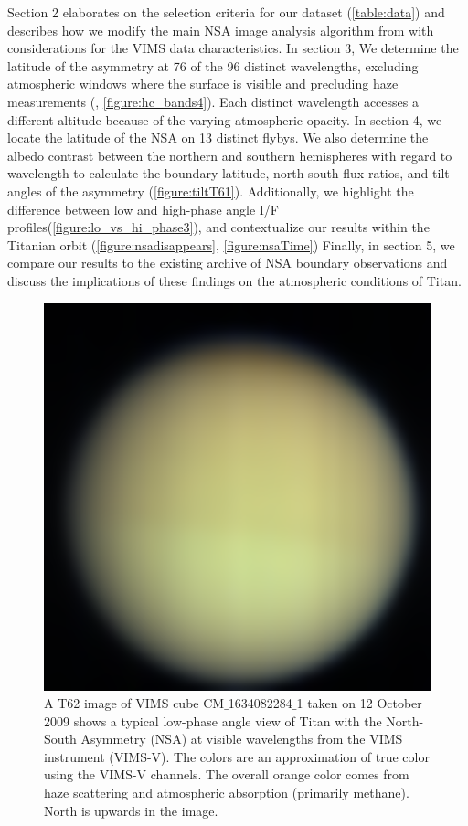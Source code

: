 \documentclass[apj,tighten]{emulateapj}
\begin{document}
Section 2 elaborates on the selection criteria for our dataset (\autoref{table:data}) and describes how we modify the main NSA image analysis algorithm from \citep{Roman2009} with considerations for the VIMS data characteristics.
In section 3, We determine the latitude of the asymmetry at 76 of the 96 distinct wavelengths, excluding atmospheric windows where the surface is visible and precluding haze measurements (\cite{vixie2012mapping}, \autoref{figure:hc_bands4}).
Each distinct wavelength accesses a different altitude because of the varying atmospheric opacity.
In section 4, we locate the latitude of the NSA on 13 distinct flybys.
We also determine the albedo contrast between the northern and southern hemispheres with regard to wavelength to calculate the boundary latitude, north-south flux ratios, and tilt angles of the asymmetry (\autoref{figure:tiltT61}). Additionally, we highlight the difference between low and high-phase angle I/F profiles(\autoref{figure:lo_vs_hi_phase3}), and contextualize our results within the Titanian orbit (\autoref{figure:nsadisappears}, \autoref{figure:nsaTime})
Finally, in section 5, we compare our results to the existing archive of NSA boundary observations and discuss the implications of these findings on the atmospheric conditions of Titan.


\begin{figure}[!htbp]
\includegraphics[width=\columnwidth]{figures/nsa_vis.png} 
\caption{\footnotesize A T62 image of VIMS cube CM$\_$1634082284$\_$1 taken on 12 October 2009 shows a typical low-phase angle view of Titan with the North-South Asymmetry (NSA) at visible wavelengths from the VIMS instrument (VIMS-V).
The colors are an approximation of true color using the VIMS-V channels.
The overall orange color comes from haze scattering and atmospheric absorption (primarily methane).
North is upwards in the image.
\label{figure:nsa_vis}}
\end{figure}
\end{document}

